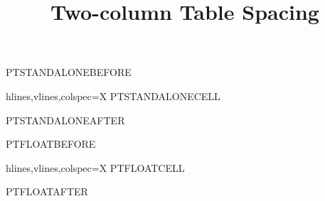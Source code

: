 \documentclass[nominted]{pt-article}
\title{Two-column Table Spacing}
\begin{document}
\noindent PTSTANDALONEBEFORE\par
\begin{tblr}{hlines,vlines,colspec={X}}
    PTSTANDALONECELL
\end{tblr}
\noindent PTSTANDALONEAFTER\par

\clearpage

\noindent PTFLOATBEFORE\par
\begin{table}[H]
    \centering
    \begin{tblr}{hlines,vlines,colspec={X}}
        PTFLOATCELL
    \end{tblr}
    \caption{PTFLOATCAPTION}
\end{table}
\noindent PTFLOATAFTER\par
\end{document}
